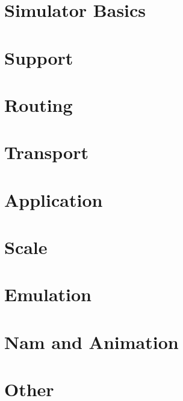 \documentclass{report}
\begin{document}
\part{Simulator Basics}



















\part{Support}



%

\part{Routing}






\part{Transport}





\part{Application}



\part{Scale}


\part{Emulation}


\part{Nam and Animation}



\part{Other}


%




\printindex
\end{document}
